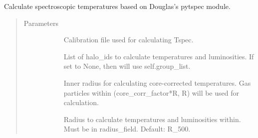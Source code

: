 \documentclass[letterpaper,10pt,english]{sphinxmanual}
\begin{document}
\begin{fulllineitems}
\begin{fulllineitems}
\end{fulllineitems}


\begin{fulllineitems}
\label{\detokenize{halo_analysis:modules.halo_analysis.halo_props.calcu_tspec}}
Calculate spectroscopic temperatures based on Douglas’s 
pytspec module.
\begin{quote}\begin{description}
\item[{Parameters}] \leavevmode\begin{description}
\item[{}] \leavevmode
Calibration file used for calculating Tspec.

\item[{}] \leavevmode
List of halo\_ids to calculate temperatures and 
luminosities. If set to None, then will use self.group\_list.

\item[{}] \leavevmode
Inner radius for calculating core-corrected temperatures. 
Gas particles within (core\_corr\_factor*R, R) will be used 
for calculation.

\item[{}] \leavevmode
Radius to calculate temperatures and luminosities within. 
Must be in radius\_field. Default: R\_500.

\end{description}

\end{description}\end{quote}

\end{fulllineitems}



\end{fulllineitems}
\end{document}
